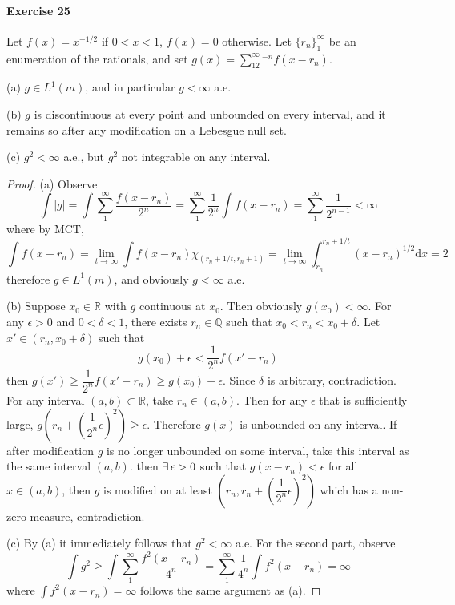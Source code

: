 \paragraph{Exercise 25}
Let $f(x)=x^{-1/2}$ if $0<x<1$, $f(x)=0$ otherwise. Let $\{r_n\}^\infty_1$ be an enumeration of the rationals, and set $g(x)=\sum^\infty_12^{-n}f(x-r_n)$.
\par (a) $g\in L^1(m)$, and in particular $g<\infty$ a.e.
\par (b) $g$ is discontinuous at every point and unbounded on every interval, and it remains so after any modification on a Lebesgue null set.
\par (c) $g^2<\infty$ a.e., but $g^2$ not integrable on any interval.
\begin{proof}
    (a) Observe
    $$
    \int |g|=\int \sum^\infty_1\dfrac{f(x-r_n)}{2^n}=\sum^\infty_1\dfrac{1}{2^n}\int f(x-r_n)=\sum^\infty_1\dfrac{1}{2^{n-1}}<\infty
    $$
    where by MCT,
    $$
    \int f(x-r_n)=\lim_{t\to\infty}\int f(x-r_n)\chi_{(r_n+1/t,r_n+1)}=\lim_{t\to\infty}\int^{r_n+1/t}_{r_n}(x-r_n)^{1/2}\mathrm{d}x=2
    $$
    therefore $g\in L^1(m)$, and obviously $g<\infty$ a.e.
    \par (b) Suppose $x_0\in\mathbb{R}$ with $g$ continuous at $x_0$. Then obviously $g(x_0)<\infty$. For any $\epsilon>0$ and $0<\delta<1$, there exists $r_n\in\mathbb{Q}$ such that $x_0<r_n<x_0+\delta$. Let $x'\in(r_n,x_0+\delta)$ such that
    $$
    g(x_0)+\epsilon<\dfrac{1}{2^n}f(x'-r_n)
    $$
    then $g(x')\ge\dfrac{1}{2^n}f(x'-r_n)\ge g(x_0)+\epsilon$. Since $\delta$ is arbitrary, contradiction. For any interval $(a,b)\subset\mathbb{R}$, take $r_n\in(a,b)$. Then for any $\epsilon$ that is sufficiently large, $g(r_n+(\dfrac{1}{2^n}\epsilon)^2)\ge\epsilon$. Therefore $g(x)$ is unbounded on any interval. If after modification $g$ is no longer unbounded on some interval, take this interval as the same interval $(a,b)$. then $\exists\, \epsilon>0$ such that $g(x-r_n)<\epsilon$ for all $x\in(a,b)$, then $g$ is modified on at least $(r_n,r_n+(\dfrac{1}{2^n}\epsilon)^2)$ which has a non-zero measure, contradiction.
    \par (c) By (a) it immediately follows that $g^2<\infty$ a.e. For the second part, observe
    $$
    \int g^2\ge\int\sum_1^\infty\dfrac{f^2(x-r_n)}{4^n}=\sum^\infty_1\dfrac{1}{4^n}\int f^2(x-r_n)=\infty
    $$
    where $\int f^2(x-r_n)=\infty$ follows the same argument as (a).
\end{proof}
